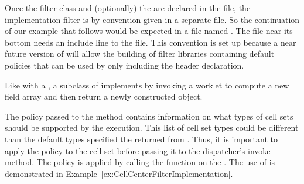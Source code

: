 Once the filter class and (optionally) the  are declared in the  file, the implementation filter is by convention given in a separate  file.
So the continuation of our example that follows would be expected in a file named .
The  file near its bottom needs an include line to the  file.
This convention is set up because a near future version of \VTKm will allow the building of filter libraries containing default policies that can be used by only including the header declaration.

Like with a , a subclass of  implements  by invoking a worklet to compute a new field array and then return a newly constructed  object.


\begin{commonerrors}
  The policy passed to the  method contains information on what types of cell sets should be supported by the execution.
  This list of cell set types could be different than the default types specified the  returned from .
   Thus, it is important to apply the policy to the cell set before passing it to the dispatcher's invoke method.
  The policy is applied by calling the  function on the .
  The use of  is demonstrated in Example~\ref{ex:CellCenterFilterImplementation}.
\end{commonerrors}



